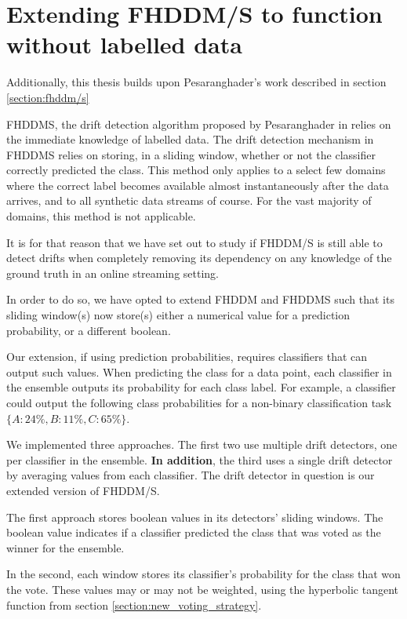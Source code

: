 \section{Extending FHDDM/S to function without labelled data}

Additionally, this thesis builds upon Pesaranghader's work described in section \ref{section:fhddm/s}

FHDDMS, the drift detection algorithm proposed by Pesaranghader in \cite{pesaranghader2016fast} relies on the immediate knowledge of labelled data. The drift detection mechanism in FHDDMS relies on storing, in a sliding window, whether or not the classifier correctly predicted the class. This method only applies to a select few domains where the correct label becomes available almost instantaneously after the data arrives, and to all synthetic data streams of course. For the vast majority of domains, this method is not applicable.

It is for that reason that we have set out to study if FHDDM/S is still able to detect drifts when completely removing its dependency on any knowledge of the ground truth in an online streaming setting.

In order to do so, we have opted to extend FHDDM and FHDDMS such that its sliding window(s) now store(s) either a numerical value for a prediction probability, or a different boolean.

Our extension, if using prediction probabilities, requires classifiers that can output such values. When predicting the class for a data point, each classifier in the ensemble outputs its probability for each class label. For example, a classifier could output the following class probabilities for a non-binary classification task $\{A: 24\%, B: 11\%, C: 65\%\}$.

We implemented three approaches. The first two use multiple drift detectors, one per classifier in the ensemble. \textbf{In addition}, the third uses a single drift detector by averaging values from each classifier. The drift detector in question is our extended version of FHDDM/S.

The first approach stores boolean values in its detectors' sliding windows. The boolean value indicates if a classifier predicted the class that was voted as the winner for the ensemble.

In the second, each window stores its classifier's probability for the class that won the vote. These values may or may not be weighted, using the hyperbolic tangent function from section \ref{section:new_voting_strategy}.


